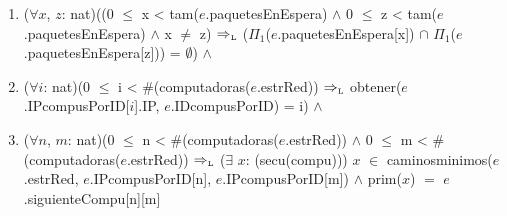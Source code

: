 \begin{Representacion}
{\begin{enumerate}
\begin{enumerate}
      \item ($\forall$ $it$:ItConj(paquete)) siguiente($it$) $\in$ dameSiguientes(dame$\Pi_2$(colaAConj( $\Pi_3$($e$.paquetesEnEspera[$L$])))) $\impluego$ siguiente($it$) $\in$ $\Pi_1$($e$.paquetesEnEspera[$L$]) 

			\item ($\forall$ $t$: tupla(prioridad,ItConj(paquete))) $t$ $\in$ colaAConj($\Pi_3$($e$.paquetesEnEspera[$L$])) $\Rightarrow$ siguiente($\Pi_2$($t$)).prioridad = $\Pi_1$($t$) 

      \item ($\forall$ $it_{1}$: ItConj(paquete)) ($\forall$ $it_{2}$: ItConj(paquete)) $it_{1}$ $\in$ dame$\Pi_{2}$(colaAConj($\Pi_{3}$($e$.paquetesEnEspera[$L$]))) $\land$ $it_{2}$ $\in$ dame$\Pi_{2}$(colaAConj( $\Pi_{3}$($e$.paquetesEnEspera[$L$]))) $it_{1}$ $\neq$ $it_{2}$ $\impluego$ siguiente($it_{1}$) $\neq$ siguiente($it_{2}$) 

      \item \#($\Pi_1$($e$.paquetesEnEspera[L])) = \#claves($\Pi_2$($e$.paquetesEnEspera[L])) $\land$ = \#colaAConj($\Pi_3$($e$.paquetesEnEspera[L])) 

      \item ($\forall c$:ID) $c \in$ claves($\Pi_2$($e$.paquetesEnEspera) $\impluego$ obtener(siguiente($\Pi_1$(obtener($c$, $\Pi_2$($e$.paquetesEnEspera))).origen, $e$.IDsCompusPorIP) = $\Pi_2$(obtener($c$, $\Pi_2$($e$.paquetesEnEspera)))) $\land$ obtener(siguiente($\Pi_1$(obtener($c$, $\Pi_2$($e$.paquetesEnEspera))).destino, $e$.IDsCompusPorIP) = $\Pi_3$(obtener($c$, $\Pi_2$($e$.paquetesEnEspera))))

  \end{enumerate}
\item     ($\forall x$, $z$: nat)((0 $\leq$ x < tam($e$.paquetesEnEspera) $\land$ 0 $\leq$ z < tam($e$.paquetesEnEspera) $\land$ x $\neq$ z) $\impluego$ ($\Pi_1$($e$.paquetesEnEspera[x]) $\cap$ $\Pi_1$($e$.paquetesEnEspera[z])) = $\emptyset$) $\land$ 

\item	($\forall i$: nat)(0 $\leq$ i < \#(computadoras($e$.estrRed)) $\impluego$ obtener($e$.IPcompusPorID[$i$].IP, $e$.IDcompusPorID) = i) $\land$ 

\item	($\forall n$, $m$: nat)(0 $\leq$ n < \#(computadoras($e$.estrRed)) $\land$ 0 $\leq$ m < \#(computadoras($e$.estrRed)) $\impluego$ ($\exists$ $x$: (secu(compu))) $x$ $\in$ caminosminimos($e$.estrRed, $e$.IPcompusPorID[n], $e$.IPcompusPorID[m]) $\land$ prim($x$) $=$ $e$.siguienteCompu[n][m] 


\end{enumerate}}
\end{Representacion}
